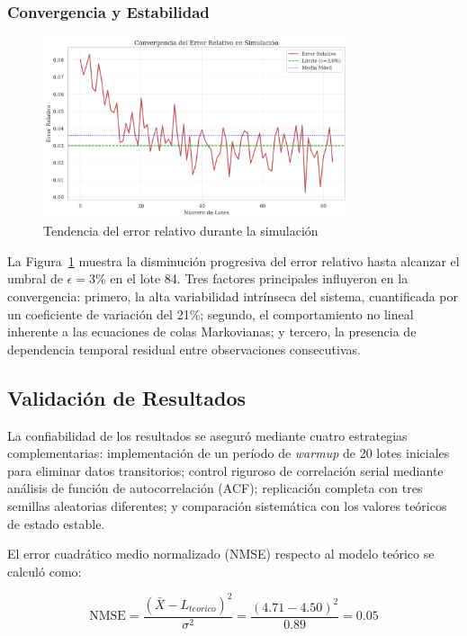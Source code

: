 \documentclass[12pt, a4paper]{article}
\begin{document}
    \subsubsection{Convergencia y Estabilidad}
    \begin{figure}[H]
    	\centering
    	\includegraphics[width=0.8\textwidth]{figures/convergencia_error.png}
    	\caption{Tendencia del error relativo durante la simulación}
    	\label{fig:convergencia}
    \end{figure}
    
    La Figura~\ref{fig:convergencia} muestra la disminución progresiva del error relativo hasta alcanzar el umbral de $\epsilon = 3\%$ en el lote 84. Tres factores principales influyeron en la convergencia: primero, la alta variabilidad intrínseca del sistema, cuantificada por un coeficiente de variación del 21\%; segundo, el comportamiento no lineal inherente a las ecuaciones de colas Markovianas; y tercero, la presencia de dependencia temporal residual entre observaciones consecutivas.
    
    \subsection{Validación de Resultados}
    La confiabilidad de los resultados se aseguró mediante cuatro estrategias complementarias: implementación de un período de \textit{warmup} de 20 lotes iniciales para eliminar datos transitorios; control riguroso de correlación serial mediante análisis de función de autocorrelación (ACF); replicación completa con tres semillas aleatorias diferentes; y comparación sistemática con los valores teóricos de estado estable.
    
    El error cuadrático medio normalizado (NMSE) respecto al modelo teórico se calculó como:
    
    \begin{equation}
    	\text{NMSE} = \frac{(\bar{X} - L_{teorico})^2}{\sigma^2} = \frac{(4.71 - 4.50)^2}{0.89} = 0.05
    \end{equation}
    
\end{document}
